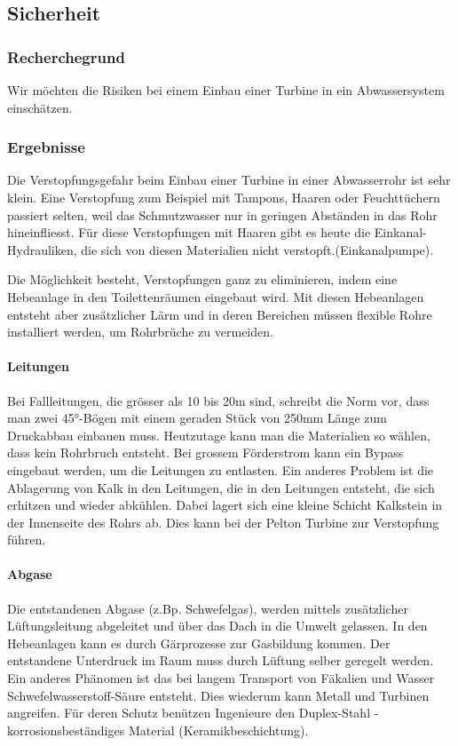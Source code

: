 \subsection{Sicherheit}


\subsubsection{Recherchegrund}
Wir möchten die Risiken bei einem Einbau einer Turbine in ein Abwassersystem einschätzen.

\subsubsection{Ergebnisse}
Die Verstopfungsgefahr beim Einbau einer Turbine in einer Abwasserrohr ist sehr klein. 
Eine Verstopfung zum Beispiel mit Tampons, Haaren oder Feuchttüchern passiert selten, weil das Schmutzwasser nur in geringen Abständen in das Rohr hineinfliesst. 
Für diese Verstopfungen mit Haaren gibt es heute die Einkanal-Hydrauliken, die sich von diesen Materialien nicht verstopft.(Einkanalpumpe).\cite{Homa-Pumpen}

Die Möglichkeit besteht,  Verstopfungen ganz zu eliminieren, indem eine Hebeanlage in den Toilettenräumen eingebaut wird. Mit diesen Hebeanlagen entsteht aber zusätzlicher Lärm und in deren Bereichen müssen flexible Rohre installiert werden, um Rohrbrüche zu vermeiden. \cite{Hebeanlagen}\cite{TippzumBau}

\paragraph{Leitungen}
Bei Fallleitungen, die grösser als 10 bis 20\si{m} sind, schreibt die Norm vor, dass man zwei 45°-Bögen mit einem geraden Stück von 250\si{mm} Länge zum Druckabbau einbauen muss. Heutzutage kann man die Materialien so wählen, dass kein Rohrbruch entsteht. Bei grossem Förderstrom kann ein Bypass eingebaut werden, um die Leitungen zu entlasten. 
Ein anderes Problem ist die Ablagerung von Kalk in den Leitungen, die in den Leitungen entsteht, die sich erhitzen und wieder abkühlen. Dabei lagert sich eine kleine Schicht Kalkstein in der Innenseite des Rohrs ab. Dies kann bei der Pelton Turbine zur Verstopfung führen.\cite{BauNetzMedia,Mediagon,ksb}

\paragraph{Abgase}
Die entstandenen Abgase (z.Bp. Schwefelgas), werden mittels zusätzlicher Lüftungsleitung abgeleitet und über das Dach in die Umwelt gelassen. In den Hebeanlagen kann es durch Gärprozesse zur Gasbildung kommen. Der entstandene Unterdruck im Raum muss durch Lüftung selber geregelt werden. 
Ein anderes Phänomen ist das bei langem Transport von Fäkalien und Wasser Schwefelwasserstoff-Säure entsteht. Dies wiederum kann Metall und Turbinen angreifen. Für deren Schutz benützen Ingenieure den Duplex-Stahl - korrosionsbeständiges Material (Keramikbeschichtung).\cite{Water_Wastewater}



